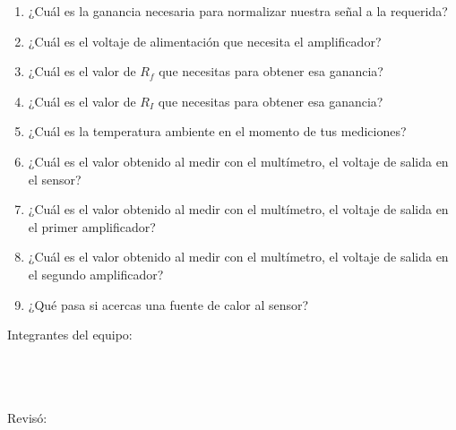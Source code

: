 	\begin{enumerate}
		\item ¿Cuál es la ganancia necesaria para normalizar nuestra señal a la requerida? \newline
		\item ¿Cuál es el voltaje de alimentación que necesita el amplificador? \newline
		\item ¿Cuál es el valor de $R_f$ que necesitas para obtener esa ganancia? \newline
		\item ¿Cuál es el valor de $R_I$ que necesitas para obtener esa ganancia? \newline
		\item ¿Cuál es la temperatura ambiente en el momento de tus mediciones? \newline
		\item ¿Cuál es el valor obtenido al medir con el multímetro, el voltaje de salida en el sensor? \newline
		\item ¿Cuál es el valor obtenido al medir con el multímetro, el voltaje de salida en el primer amplificador? \newline
		\item ¿Cuál es el valor obtenido al medir con el multímetro, el voltaje de salida en el segundo amplificador? \newline
		\item ¿Qué pasa si acercas una fuente de calor al sensor? \newline
	\end{enumerate}

	Integrantes del equipo: \\[0.2cm]
	\horrule{0.5pt} \\[0.2cm] %
	\horrule{0.5pt} \\[0.2cm] %
	\horrule{0.5pt} \\[0.2cm] %
	\horrule{0.5pt} %

	Revisó: \\[0.2cm]
	\horrule{0.5pt} \\%
    

